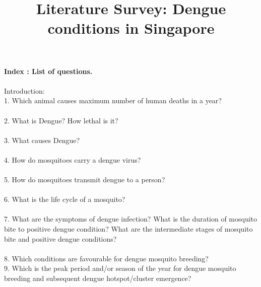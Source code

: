 \documentclass[11pt]{exam}
\begin{document}
\title{\textbf{Literature Survey: Dengue conditions in Singapore}}
\maketitle

\textbf{Index : List of questions.} \\ \\
Introduction: \\

1. Which animal causes maximum number of human deaths in a year? \\ \\
2. What is Dengue? How lethal is it? \\ \\
3. What causes Dengue?  \\ \\
4. How do mosquitoes carry a dengue virus? \\ \\
5. How do mosquitoes transmit dengue to a person? \\ \\%
6. What is the life cycle of a mosquito?  \\ \\
7. What are the symptoms of dengue infection? What is the duration of mosquito bite to positive dengue condition? What are the intermediate stages of mosquito bite and positive dengue conditions?\\ \\
8. Which conditions are favourable for dengue mosquito breeding?\\ %
9. Which is the peak period and/or season of the year for dengue mosquito breeding and subsequent dengue hotspot/cluster emergence? \\ \\%
\end{document}
